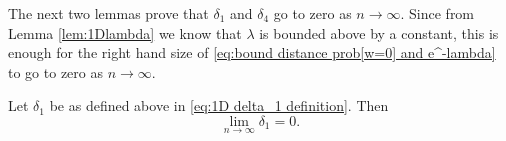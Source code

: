 	The next two lemmas prove that $\delta_1$ and $\delta_4$ go to zero as $n \rightarrow \infty$. Since from Lemma \ref{lem:1Dlambda} we know that $\lambda$ is bounded above by a constant, this is enough for the right hand size of \eqref{eq:bound distance prob[w=0] and e^-lambda} to go to zero as $n \rightarrow \infty$.

	\begin{lemma}
	\label{lem:delta1 goes to 0}
		Let $\delta_1$ be as defined above in \eqref{eq:1D delta_1 definition}. Then
		\begin{equation}
			\lim_{n\rightarrow\infty} \delta_1 = 0.
		\end{equation}
	\end{lemma}
